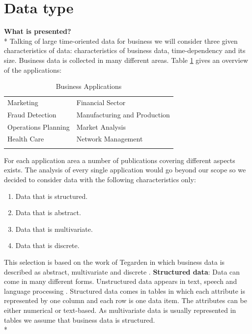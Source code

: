 \section{Data type} \label{data}

\textbf{What is presented?}\\*
Talking of large time-oriented data for business we will consider three given characteristics of data: characteristics of business data, time-dependency and its size. Business data is collected in many different areas. Table \ref{table:applications} gives an overview of the applications: 

\begin{table}[H]
	\centering
	\caption[Business Applications]{Business Applications  \cite{Brachman1996,Tegarden1999}}
	\label{businessapplications}
	\begin{tabular}{ll}
	\toprule
	Marketing & Financial Sector \\
	Fraud Detection & Manufacturing and Production \\
	Operations Planning & Market Analysis \\
	Health Care & Network Management\\
	\bottomrule
	\label{table:applications}
	\end{tabular}
\end{table}
For each application area a number of publications covering different aspects exists. The analysis of every single application would go beyond our scope so we decided to consider data with the following characteristics only: 
\begin{enumerate}
    \item Data that is structured. 
    \item Data that is abstract.
    \item Data that is multivariate.
    \item Data that is discrete.
\end{enumerate}
This selection is based on the work of Tegarden in which business data is described as abstract, multivariate and discrete  \cite{Tegarden1999}.
\textbf{Structured data}: Data can come in many different forms. Unstructured data appears in text, speech and language processing  \cite{Borgo2013}. Structured data comes in tables in which each attribute is represented by one column and each row is one data item. The attributes can be either numerical or text-based. As multivariate data is usually represented in tables  \cite{Borgo2013} we assume that business data is structured.\\*
